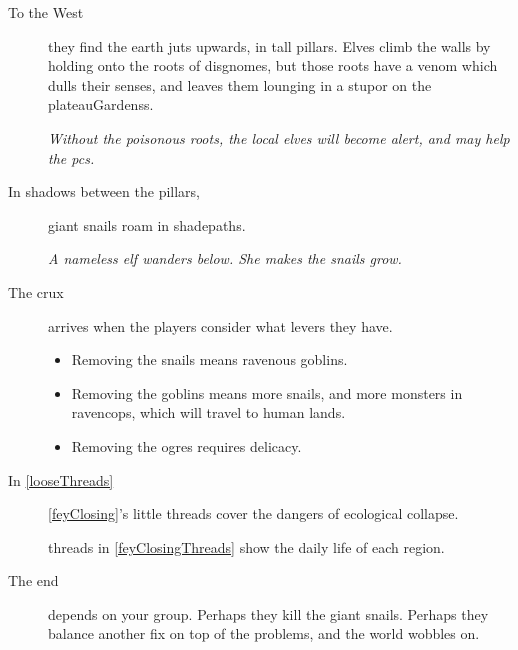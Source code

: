 \begin{multicols}{2}
\begin{description}
  \item[To the West]
  they find the earth juts upwards, in tall pillars.
  Elves climb the walls by holding onto the roots of \glspl{disgnome}, but those roots have a venom which dulls their senses, and leaves them lounging in a stupor on the \glspl{plateauGardens}.

  \textit{Without the poisonous roots, the local elves will become alert, and may help the \glspl{pc}.}
  \item[In shadows between the pillars,]
  giant snails roam in \gls{shadepaths}.

  \textit{A nameless elf wanders below.
  She makes the snails grow.}

  \item[The crux]
  arrives when the players consider what levers they have.
  \begin{itemize}
    \item
    Removing the snails means ravenous goblins.
    \item
    Removing the goblins means more snails, and more monsters in \gls{ravencops}, which will travel to human lands.
    \item
    Removing the \glspl{ogre} requires delicacy.
  \end{itemize}
  \item[In \autoref{looseThreads}]
  \autoref{feyClosing}'s little \glspl{thread} cover the dangers of ecological collapse.

  \Glspl{thread} in \autoref{feyClosingThreads} show the daily life of each \gls{region}.

  \item[The end]
  depends on your group.
  Perhaps they kill the giant snails.
  Perhaps they balance another fix on top of the problems, and the world wobbles on.
\end{description}


\end{multicols}
